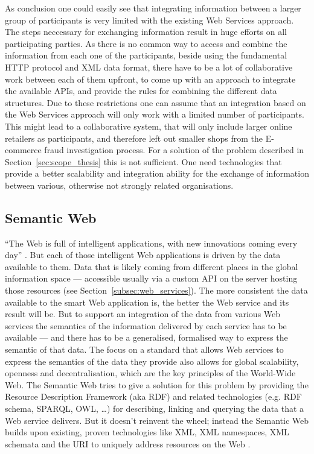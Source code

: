 As conclusion one could easily see that integrating information between a larger group of participants is very limited with the existing Web Services approach. The steps neccessary for exchanging information result in huge efforts on all participating parties. As there is no common way to access and combine the information from each one of the participants, beside using the fundamental \gls{HTTP} protocol and \gls{XML} data format, there have to be a lot of collaborative work between each of them upfront, to come up with an approach to integrate the available \gls{API}s, and provide the rules for combining the different data structures. Due to these restrictions one can assume that an integration based on the Web Services approach will only work with a limited number of participants. This might lead to a collaborative system, that will only include larger online retailers as participants, and therefore left out smaller shops from the \gls{E-commerce} fraud investigation process. For a solution of the problem described in Section~\ref{sec:scope_thesis} this is not sufficient. One need technologies that provide a better scalability and integration ability for the exchange of information between various, otherwise not strongly related organisations.


\subsection{Semantic Web}
\label{subsec:web_data}

``The Web is full of intelligent applications, with new innovations coming every day'' \citep{allemang2011semantic}. But each of those intelligent Web applications is driven by the data available to them. Data that is likely coming from different places in the global information space — accessible usually via a custom API on the server hosting those resources (see Section~\ref{subsec:web_services}). The more consistent the data available to the smart Web application is, the better the Web service and its result will be. But to support an integration of the data from various Web services the semantics of the information delivered by each service has to be available — and there has to be a generalised, formalised way to express the semantic of that data. The focus on a standard that allows Web services to express the semantics of the data they provide also allows for global scalability, openness and decentralisation, which are the key principles of the World-Wide Web. The Semantic Web tries to give a solution for this problem by providing the Resource Description Framework (aka \gls{RDF}) and related technologies (e.g. RDF schema, \gls{SPARQL}, \gls{OWL}, \ldots) for describing, linking and querying the data that a Web service delivers. But it doesn’t reinvent the wheel; instead the Semantic Web builds upon existing, proven technologies like \gls{XML}, XML namespaces, XML schemata and the \gls{URI} to uniquely address resources on the Web \citep{allemang2011semantic}. \\

